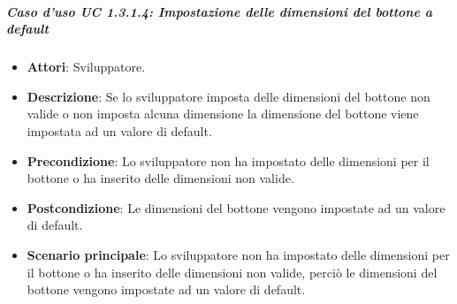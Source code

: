 \subparagraph{Caso d'uso UC 1.3.1.4: Impostazione delle dimensioni del bottone a default}

\FloatBarrier
\begin{itemize}
\item\textbf{Attori}: Sviluppatore.
\item\textbf{Descrizione}: Se lo sviluppatore imposta delle dimensioni del bottone non valide o non imposta alcuna dimensione la dimensione del bottone viene impostata ad un valore di default.
\item\textbf{Precondizione}: Lo sviluppatore non ha impostato delle dimensioni per il bottone o ha inserito delle dimensioni non valide.
\item\textbf{Postcondizione}: Le dimensioni del bottone vengono impostate ad un valore di default.
\item\textbf{Scenario principale}: Lo sviluppatore non ha impostato delle dimensioni per il bottone o ha inserito delle dimensioni non valide, perciò le dimensioni del bottone vengono impostate ad un valore di default.
\end{itemize}

